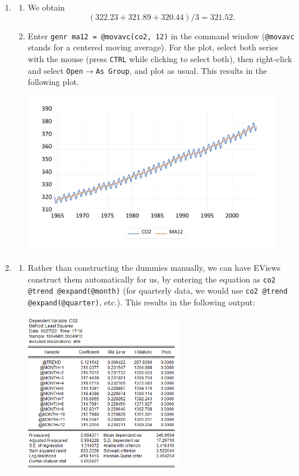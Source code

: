 \documentclass[11pt, a4paper]{article}
\begin{document}
\begin{enumerate}
\item 
\begin{enumerate}
\item We obtain
\[
(322.23+321.89+320.44)/3 = 321.52.
\]
\item Enter \verb.genr ma12 = @movavc(co2, 12). in the command window (\verb.@movavc. stands for a centered moving average). For the plot, select both series with the mouse (press \texttt{CTRL} while clicking to select both), then right-click and select \texttt{Open$\rightarrow$As Group}, and plot as usual. This results in the following plot.
\begin{center}
\includegraphics[height=7cm]{ma12}
\end{center}
\end{enumerate}
\item
\begin{enumerate}
\item Rather than constructing the dummies manually, we can have EViews construct them automatically for us, by entering the equation as \verb.co2 @trend @expand(@month). (for quarterly data, we would use \verb+co2 @trend @expand(@quarter)+, etc.). This results in the following output:
\begin{center}
\includegraphics[height=7cm]{seasonal1}

\end{center}
\end{enumerate}
\end{enumerate}
\end{document}
